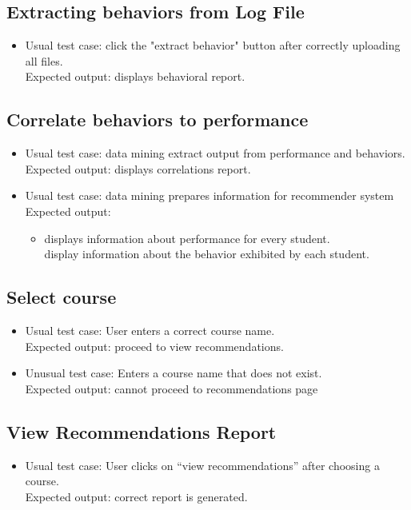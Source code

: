 \documentclass[12pt]{article}
\begin{document}
\subsection{Extracting behaviors from Log File}
\begin{itemize}
	\item Usual test case: click the "extract behavior" button after correctly uploading all files. \\
		Expected output: displays behavioral report.
\end{itemize}

\subsection{Correlate behaviors to performance}
\begin{itemize}
\item Usual test case: data mining extract output from performance and behaviors. \\
		Expected output: displays correlations report.
		\item Usual test case: data mining prepares information for recommender system \\
		Expected output: \begin{itemize} \item displays information about performance for every student.\\
		display information about the behavior exhibited by each student.
		\end{itemize}
\end{itemize}


\subsection{Select course}
\begin{itemize}
\item Usual test case: User enters a correct course name. \\
		Expected output: proceed to view recommendations.
		\item Unusual test case: Enters a course name that does not exist. \\
		Expected output: cannot proceed to recommendations page
\end{itemize}

\subsection{View Recommendations Report}
\begin{itemize}
	\item Usual test case: User clicks on “view recommendations” after choosing a course.\\
		Expected output: correct report is generated.
\end{itemize}
\end{document}
